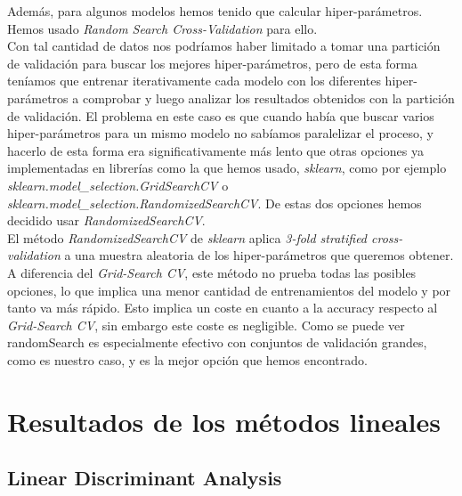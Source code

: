 \documentclass[a4paper]{article}
\begin{document}
Además, para algunos modelos hemos tenido que calcular hiper-parámetros. Hemos usado \textit{Random Search Cross-Validation} para ello.\\

Con tal cantidad de datos nos podríamos haber limitado a tomar una partición de validación para buscar los mejores hiper-parámetros, pero de esta forma teníamos que entrenar iterativamente cada modelo con los diferentes hiper-parámetros a comprobar y luego analizar los resultados obtenidos con la partición de validación. El problema en este caso es que cuando había que buscar varios hiper-parámetros para un mismo modelo no sabíamos paralelizar el proceso, y hacerlo de esta forma era significativamente más lento que otras opciones ya implementadas en librerías como la que hemos usado, \textit{sklearn}, como por ejemplo  \textit{sklearn.model\_selection.GridSearchCV} o \textit{sklearn.model\_selection.RandomizedSearchCV}. De estas dos opciones hemos decidido usar \textit{RandomizedSearchCV}.\\

El método \textit{RandomizedSearchCV} de \textit{sklearn} aplica \textit{3-fold stratified cross-validation} a una muestra aleatoria de los hiper-parámetros que queremos obtener. A diferencia del \textit{Grid-Search CV}, este método no prueba todas las posibles opciones, lo que implica una menor cantidad de entrenamientos del modelo y por tanto va más rápido. Esto implica un coste en cuanto a la accuracy respecto al \textit{Grid-Search CV}, sin embargo este coste es negligible. Como se puede ver randomSearch\cite{randomSearch} es especialmente efectivo con conjuntos de validación grandes, como es nuestro caso, y es la mejor opción que hemos encontrado.\\

\section{Resultados de los métodos lineales}

\subsection{Linear Discriminant Analysis}
\end{document}
